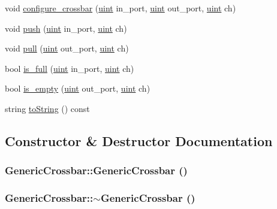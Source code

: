 \begin{CompactItemize}
\item 
void \hyperlink{classGenericCrossbar_50c8203133960f74f6d82649b0c864be}{configure\_\-crossbar} (\hyperlink{outputBuffer_8h_91ad9478d81a7aaf2593e8d9c3d06a14}{uint} in\_\-port, \hyperlink{outputBuffer_8h_91ad9478d81a7aaf2593e8d9c3d06a14}{uint} out\_\-port, \hyperlink{outputBuffer_8h_91ad9478d81a7aaf2593e8d9c3d06a14}{uint} ch)
\item 
void \hyperlink{classGenericCrossbar_d925d4a2c3b5b4585e087dc423eeb0b8}{push} (\hyperlink{outputBuffer_8h_91ad9478d81a7aaf2593e8d9c3d06a14}{uint} in\_\-port, \hyperlink{outputBuffer_8h_91ad9478d81a7aaf2593e8d9c3d06a14}{uint} ch)
\item 
void \hyperlink{classGenericCrossbar_3c3fa82ff5db189ec69497f79e15112c}{pull} (\hyperlink{outputBuffer_8h_91ad9478d81a7aaf2593e8d9c3d06a14}{uint} out\_\-port, \hyperlink{outputBuffer_8h_91ad9478d81a7aaf2593e8d9c3d06a14}{uint} ch)
\item 
bool \hyperlink{classGenericCrossbar_1949b9db3b5b1950ad6a2c9e46103024}{is\_\-full} (\hyperlink{outputBuffer_8h_91ad9478d81a7aaf2593e8d9c3d06a14}{uint} in\_\-port, \hyperlink{outputBuffer_8h_91ad9478d81a7aaf2593e8d9c3d06a14}{uint} ch)
\item 
bool \hyperlink{classGenericCrossbar_b1dc236c4543805ac9fd50f25adcc27e}{is\_\-empty} (\hyperlink{outputBuffer_8h_91ad9478d81a7aaf2593e8d9c3d06a14}{uint} out\_\-port, \hyperlink{outputBuffer_8h_91ad9478d81a7aaf2593e8d9c3d06a14}{uint} ch)
\item 
string \hyperlink{classGenericCrossbar_6794211c84eda89c8ff8e2460d5201fc}{toString} () const 
\end{CompactItemize}


\subsection{Constructor \& Destructor Documentation}
\hypertarget{classGenericCrossbar_4a686c329c66490d847cc938b7e02aae}{
\subsubsection[{GenericCrossbar}]{\setlength{\rightskip}{0pt plus 5cm}GenericCrossbar::GenericCrossbar ()}}
\label{classGenericCrossbar_4a686c329c66490d847cc938b7e02aae}


\hypertarget{classGenericCrossbar_53c13d3c966feb35331958f7a2f9f90c}{
\subsubsection[{$\sim$GenericCrossbar}]{\setlength{\rightskip}{0pt plus 5cm}GenericCrossbar::$\sim$GenericCrossbar ()}}
\label{classGenericCrossbar_53c13d3c966feb35331958f7a2f9f90c}


